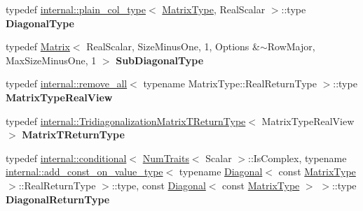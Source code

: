 \begin{DoxyCompactItemize}
typedef \mbox{\hyperlink{struct_eigen_1_1internal_1_1plain__col__type}{internal\+::plain\+\_\+col\+\_\+type}}$<$ \mbox{\hyperlink{class_eigen_1_1_tridiagonalization_add0f4b2216d0ea8ee0f7d8525deaf0a9}{Matrix\+Type}}, Real\+Scalar $>$\+::type {\bfseries Diagonal\+Type}
\item 
\mbox{\label{class_eigen_1_1_tridiagonalization_a68729d89d61edbae954fc7ad0b72a5b8}} 
typedef \mbox{\hyperlink{class_eigen_1_1_matrix}{Matrix}}$<$ Real\+Scalar, Size\+Minus\+One, 1, Options \&$\sim$Row\+Major, Max\+Size\+Minus\+One, 1 $>$ {\bfseries Sub\+Diagonal\+Type}
\item 
\mbox{\label{class_eigen_1_1_tridiagonalization_a28b71fa9329f5881fa2fc6732941c2b3}} 
typedef \mbox{\hyperlink{struct_eigen_1_1internal_1_1remove__all}{internal\+::remove\+\_\+all}}$<$ typename Matrix\+Type\+::\+Real\+Return\+Type $>$\+::type {\bfseries Matrix\+Type\+Real\+View}
\item 
\mbox{\label{class_eigen_1_1_tridiagonalization_af7d2f1a605207a321f494d9ee216f8f5}} 
typedef \mbox{\hyperlink{struct_eigen_1_1internal_1_1_tridiagonalization_matrix_t_return_type}{internal\+::\+Tridiagonalization\+Matrix\+T\+Return\+Type}}$<$ Matrix\+Type\+Real\+View $>$ {\bfseries Matrix\+T\+Return\+Type}
\item 
\mbox{\label{class_eigen_1_1_tridiagonalization_aa2b866d55c2210db98a7ab2ccf0d2254}} 
typedef \mbox{\hyperlink{struct_eigen_1_1internal_1_1conditional}{internal\+::conditional}}$<$ \mbox{\hyperlink{struct_eigen_1_1_num_traits}{Num\+Traits}}$<$ Scalar $>$\+::Is\+Complex, typename \mbox{\hyperlink{struct_eigen_1_1internal_1_1add__const__on__value__type}{internal\+::add\+\_\+const\+\_\+on\+\_\+value\+\_\+type}}$<$ typename \mbox{\hyperlink{class_eigen_1_1_diagonal}{Diagonal}}$<$ const \mbox{\hyperlink{class_eigen_1_1_tridiagonalization_add0f4b2216d0ea8ee0f7d8525deaf0a9}{Matrix\+Type}} $>$\+::Real\+Return\+Type $>$\+::type, const \mbox{\hyperlink{class_eigen_1_1_diagonal}{Diagonal}}$<$ const \mbox{\hyperlink{class_eigen_1_1_tridiagonalization_add0f4b2216d0ea8ee0f7d8525deaf0a9}{Matrix\+Type}} $>$ $>$\+::type {\bfseries Diagonal\+Return\+Type}
\item 
\mbox{\label{class_eigen_1_1_tridiagonalization_a596ee75896d4302b84b1467d5c74e871}} 

\end{DoxyCompactItemize}
